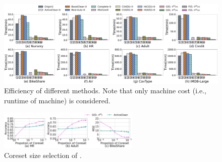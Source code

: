 

\begin{figure}
	\centering
	\includegraphics[width=\textwidth]{figs/efficiency_new.pdf}
	\caption{Efficiency of different methods. Note that only machine cost (i.e., runtime of machine) is considered.}
	\label{fig:efficiency}
\end{figure}





\begin{figure}
	\vspace{-1em}
	\centering
	\includegraphics[width=0.6\textwidth]{figs/e2e}
	\caption{ Coreset size selection of \ours.}
	\label{fig:e2e}
\end{figure}





